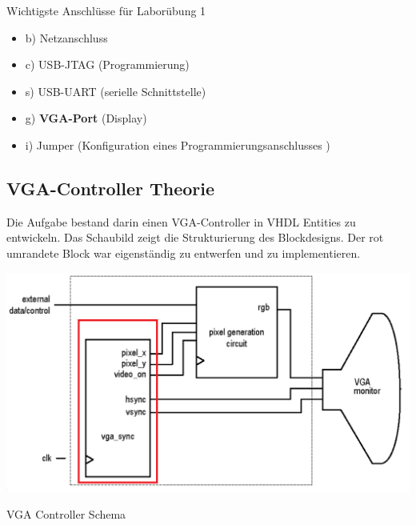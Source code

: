 Wichtigste Anschlüsse für Laborübung 1
\begin{itemize}
\item b) Netzanschluss
\item c) USB-JTAG (Programmierung)
\item s) USB-UART (serielle Schnittstelle)
\item g) \textbf{VGA-Port} (Display)
\item i) Jumper (Konfiguration eines Programmierungsanschlusses )
\end{itemize}

\subsection {VGA-Controller Theorie}
Die Aufgabe bestand darin einen VGA-Controller in VHDL Entities zu entwickeln. Das Schaubild zeigt die Strukturierung 
des Blockdesigns. Der rot umrandete Block war eigenständig zu entwerfen und zu implementieren. \\
\begin{minipage}{\textwidth}
    \begin{center}        
        \includegraphics[scale=0.5]{img/vga_contr.png} 
    \end{center}
\end{minipage}
\begin{center}
VGA Controller Schema
\end{center}

